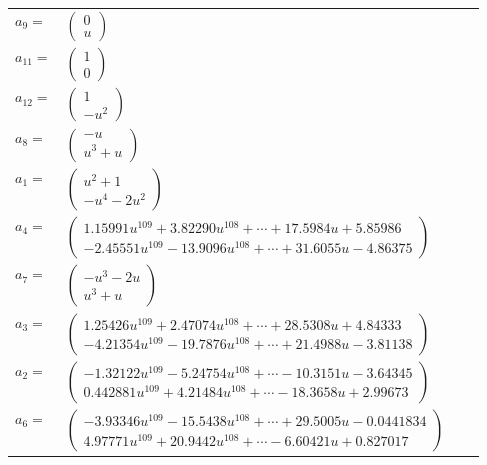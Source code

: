 \documentclass[1p]{elsarticle_modified}
\theoremstyle{definition}
\begin{document}
\begin{tabular}{m{7pt} m{180pt} m{7pt} m{180pt} }
\flushright $a_{9}=$&$\begin{pmatrix}0\\u\end{pmatrix}$ \\
\flushright $a_{11}=$&$\begin{pmatrix}1\\0\end{pmatrix}$ \\
\flushright $a_{12}=$&$\begin{pmatrix}1\\- u^2\end{pmatrix}$ \\
\flushright $a_{8}=$&$\begin{pmatrix}- u\\u^3+u\end{pmatrix}$ \\
\flushright $a_{1}=$&$\begin{pmatrix}u^2+1\\- u^4-2 u^2\end{pmatrix}$ \\
\flushright $a_{4}=$&$\begin{pmatrix}1.15991 u^{109}+3.82290 u^{108}+\cdots+17.5984 u+5.85986\\-2.45551 u^{109}-13.9096 u^{108}+\cdots+31.6055 u-4.86375\end{pmatrix}$ \\
\flushright $a_{7}=$&$\begin{pmatrix}- u^3-2 u\\u^3+u\end{pmatrix}$ \\
\flushright $a_{3}=$&$\begin{pmatrix}1.25426 u^{109}+2.47074 u^{108}+\cdots+28.5308 u+4.84333\\-4.21354 u^{109}-19.7876 u^{108}+\cdots+21.4988 u-3.81138\end{pmatrix}$ \\
\flushright $a_{2}=$&$\begin{pmatrix}-1.32122 u^{109}-5.24754 u^{108}+\cdots-10.3151 u-3.64345\\0.442881 u^{109}+4.21484 u^{108}+\cdots-18.3658 u+2.99673\end{pmatrix}$ \\
\flushright $a_{6}=$&$\begin{pmatrix}-3.93346 u^{109}-15.5438 u^{108}+\cdots+29.5005 u-0.0441834\\4.97771 u^{109}+20.9442 u^{108}+\cdots-6.60421 u+0.827017\end{pmatrix}$ \\

\end{tabular}
\end{document}
